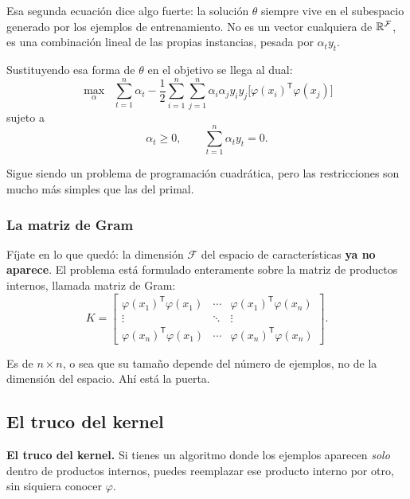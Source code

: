 \documentclass[11pt,letterpaper]{article}
\begin{document}
\begin{idea}
  Esa segunda ecuación dice algo fuerte: la solución $\theta$ siempre
  vive en el subespacio generado por los ejemplos de entrenamiento. No
  es un vector cualquiera de $\mathbb{R}^{\mathcal{F}}$, es una combinación
  lineal de las propias instancias, pesada por $\alpha_t y_t$.
\end{idea}

Sustituyendo esa forma de $\theta$ en el objetivo se llega al dual:
\[
    \max_{\alpha} \;\; \sum_{t=1}^{n} \alpha_t
    - \frac{1}{2} \sum_{i=1}^{n} \sum_{j=1}^{n}
      \alpha_i \alpha_j y_i y_j
      \big[\varphi(x_i)^{\mathsf{T}} \varphi(x_j)\big]
\]
sujeto a
\[
    \alpha_t \geq 0 , \qquad \sum_{t=1}^{n} \alpha_t y_t = 0 .
\]

Sigue siendo un problema de programación cuadrática, pero las
restricciones son mucho más simples que las del primal.

\subsubsection*{La matriz de Gram}

Fíjate en lo que quedó: la dimensión $\mathcal{F}$ del espacio de
características \textbf{ya no aparece}. El problema está formulado
enteramente sobre la matriz de productos internos, llamada matriz de
Gram:
\[
    K =
    \begin{bmatrix}
      \varphi(x_1)^{\mathsf{T}}\varphi(x_1) & \cdots &
      \varphi(x_1)^{\mathsf{T}}\varphi(x_n) \\
      \vdots & \ddots & \vdots \\
      \varphi(x_n)^{\mathsf{T}}\varphi(x_1) & \cdots &
      \varphi(x_n)^{\mathsf{T}}\varphi(x_n)
    \end{bmatrix} .
\]

Es de $n \times n$, o sea que su tamaño depende del número de
ejemplos, no de la dimensión del espacio. Ahí está la puerta.


\subsection*{El truco del kernel}

\begin{idea}
  \textbf{El truco del kernel.} Si tienes un algoritmo donde los
  ejemplos aparecen \emph{solo} dentro de productos internos, puedes
  reemplazar ese producto interno por otro, sin siquiera conocer
  $\varphi$.
\end{idea}
\end{document}
